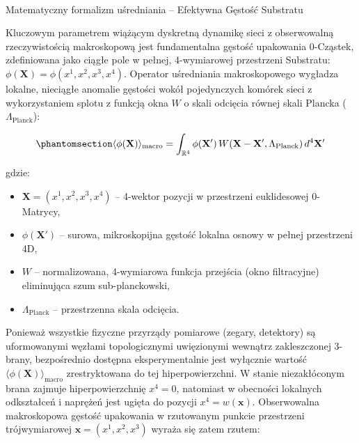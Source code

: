 \documentclass[
  polish,
  letterpaper,
  DIV=11,
  numbers=noendperiod,
  oneside]{scrartcl}
\makeatletter
\let\oldparagraph\paragraph
\renewcommand{\paragraph}{
    \@ifstar
      \xxxParagraphStar
      \xxxParagraphNoStar
  }
\newcommand{\xxxParagraphStar}[1]{\oldparagraph*{#1}\mbox{}}
\newcommand{\xxxParagraphNoStar}[1]{\oldparagraph{#1}\mbox{}}
\providecommand{\tightlist}{%
  \setlength{\itemsep}{0pt}\setlength{\parskip}{0pt}}
\makeatother
\begin{document}
\paragraph{Matematyczny formalizm uśredniania -- Efektywna Gęstość
Substratu}\label{sec-1-2a-2}

Kluczowym parametrem wiążącym dyskretną dynamikę sieci z obserwowalną
rzeczywistością makroskopową jest fundamentalna gęstość upakowania
0-Cząstek, zdefiniowana jako ciągłe pole w pełnej, 4-wymiarowej
przestrzeni Substratu: \(\phi(\mathbf{X}) = \phi(x^1, x^2, x^3, x^4)\).
Operator uśredniania makroskopowego wygładza lokalne, nieciągłe anomalie
gęstości wokół pojedynczych komórek sieci z wykorzystaniem splotu z
funkcją okna \(W\) o skali odcięcia równej skali Plancka
(\(\Lambda_{\text{Planck}}\)):

\begin{equation}\protect\phantomsection\label{eq-1-2-1}{\langle\phi(\mathbf{X})\rangle_{\text{macro}} = \int_{\mathbb{R}^4} \phi(\mathbf{X}') \, W(\mathbf{X} - \mathbf{X}', \Lambda_{\text{Planck}}) \, d^4\mathbf{X}'}\end{equation}

gdzie:

\begin{itemize}
\tightlist
\item
  \(\mathbf{X} = (x^1, x^2, x^3, x^4)\) -- 4-wektor pozycji w
  przestrzeni euklidesowej 0-Matrycy,
\item
  \(\phi(\mathbf{X}')\) -- surowa, mikroskopijna gęstość lokalna osnowy
  w pełnej przestrzeni 4D,
\item
  \(W\) -- normalizowana, 4-wymiarowa funkcja przejścia (okno
  filtracyjne) eliminująca szum sub-planckowski,
\item
  \(\Lambda_{\text{Planck}}\) -- przestrzenna skala odcięcia.
\end{itemize}

Ponieważ wszystkie fizyczne przyrządy pomiarowe (zegary, detektory) są
uformowanymi węzłami topologicznymi uwięzionymi wewnątrz zakleszczonej
3-brany, bezpośrednio dostępna eksperymentalnie jest wyłącznie wartość
\(\langle\phi(\mathbf{X})\rangle_{\text{macro}}\) zrestryktowana do tej
hiperpowierzchni. W stanie niezakłóconym brana zajmuje hiperpowierzchnię
\(x^4 = 0\), natomiast w obecności lokalnych odkształceń i naprężeń jest
ugięta do pozycji \(x^4 = w(\mathbf{x})\). Obserwowalna makroskopowa
gęstość upakowania w rzutowanym punkcie przestrzeni trójwymiarowej
\(\mathbf{x} = (x^1, x^2, x^3)\) wyraża się zatem rzutem:
\end{document}
